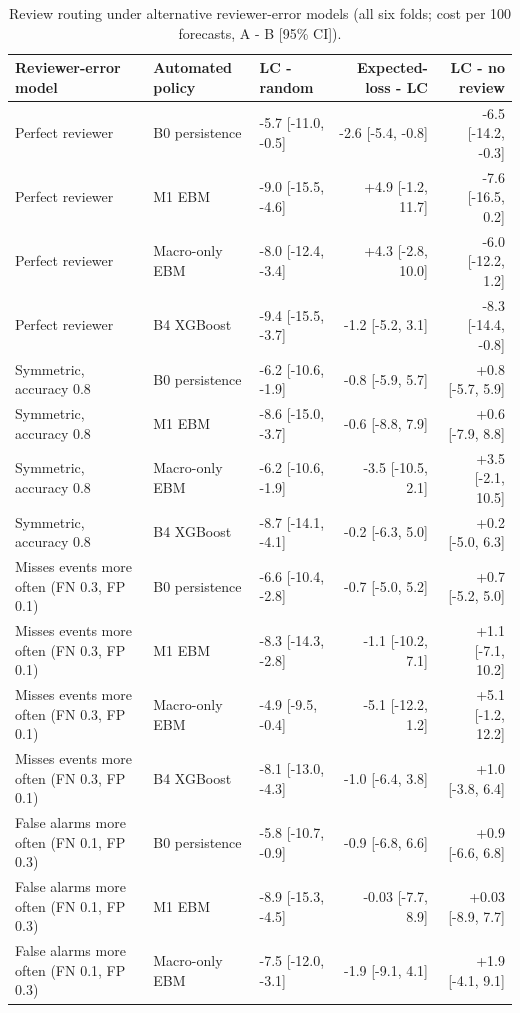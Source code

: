 \documentclass[preprint,12pt,authoryear]{elsarticle}
\begin{document}
\begin{table}[!htbp]
\centering
\scriptsize
\setlength{\tabcolsep}{3pt}
\caption{Review routing under alternative reviewer-error models (all six folds; cost per 100 forecasts, A - B [95\% CI]).}
\label{tab:reviewerr}
\begin{tabular}{lllrr}
\toprule
Reviewer-error model & Automated policy & LC - random & Expected-loss - LC & LC - no review \\
\midrule
Perfect reviewer & B0 persistence & -5.7 [-11.0, -0.5] & -2.6 [-5.4, -0.8] & -6.5 [-14.2, -0.3] \\
Perfect reviewer & M1 EBM & -9.0 [-15.5, -4.6] & +4.9 [-1.2, 11.7] & -7.6 [-16.5, 0.2] \\
Perfect reviewer & Macro-only EBM & -8.0 [-12.4, -3.4] & +4.3 [-2.8, 10.0] & -6.0 [-12.2, 1.2] \\
Perfect reviewer & B4 XGBoost & -9.4 [-15.5, -3.7] & -1.2 [-5.2, 3.1] & -8.3 [-14.4, -0.8] \\
Symmetric, accuracy 0.8 & B0 persistence & -6.2 [-10.6, -1.9] & -0.8 [-5.9, 5.7] & +0.8 [-5.7, 5.9] \\
Symmetric, accuracy 0.8 & M1 EBM & -8.6 [-15.0, -3.7] & -0.6 [-8.8, 7.9] & +0.6 [-7.9, 8.8] \\
Symmetric, accuracy 0.8 & Macro-only EBM & -6.2 [-10.6, -1.9] & -3.5 [-10.5, 2.1] & +3.5 [-2.1, 10.5] \\
Symmetric, accuracy 0.8 & B4 XGBoost & -8.7 [-14.1, -4.1] & -0.2 [-6.3, 5.0] & +0.2 [-5.0, 6.3] \\
Misses events more often (FN 0.3, FP 0.1) & B0 persistence & -6.6 [-10.4, -2.8] & -0.7 [-5.0, 5.2] & +0.7 [-5.2, 5.0] \\
Misses events more often (FN 0.3, FP 0.1) & M1 EBM & -8.3 [-14.3, -2.8] & -1.1 [-10.2, 7.1] & +1.1 [-7.1, 10.2] \\
Misses events more often (FN 0.3, FP 0.1) & Macro-only EBM & -4.9 [-9.5, -0.4] & -5.1 [-12.2, 1.2] & +5.1 [-1.2, 12.2] \\
Misses events more often (FN 0.3, FP 0.1) & B4 XGBoost & -8.1 [-13.0, -4.3] & -1.0 [-6.4, 3.8] & +1.0 [-3.8, 6.4] \\
False alarms more often (FN 0.1, FP 0.3) & B0 persistence & -5.8 [-10.7, -0.9] & -0.9 [-6.8, 6.6] & +0.9 [-6.6, 6.8] \\
False alarms more often (FN 0.1, FP 0.3) & M1 EBM & -8.9 [-15.3, -4.5] & -0.03 [-7.7, 8.9] & +0.03 [-8.9, 7.7] \\
False alarms more often (FN 0.1, FP 0.3) & Macro-only EBM & -7.5 [-12.0, -3.1] & -1.9 [-9.1, 4.1] & +1.9 [-4.1, 9.1] \\

\end{tabular}
\end{table}
\end{document}
